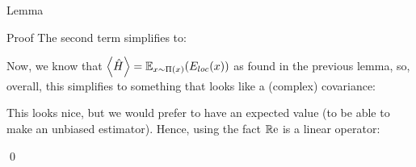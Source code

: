 \documentclass[a4paper]{article}
\begin{document}
\begin{parag}{Lemma}
\begin{subparag}{Proof}
        The second term simplifies to:

        Now, we know that $\left\langle \hat{H} \right\rangle = \exval_{x \followsdistr \Pi\left(x\right)}\left(E_{loc}\left(x\right)\right)$ as found in the previous lemma, so, overall, this simplifies to something that looks like a (complex) covariance: 

        This looks nice, but we would prefer to have an expected value (to be able to make an unbiased estimator). Hence, using the fact $\operatorname{\mathbb{R}e}$ is a linear operator:

        \qed
    \end{subparag}
\end{parag}
\end{document}
